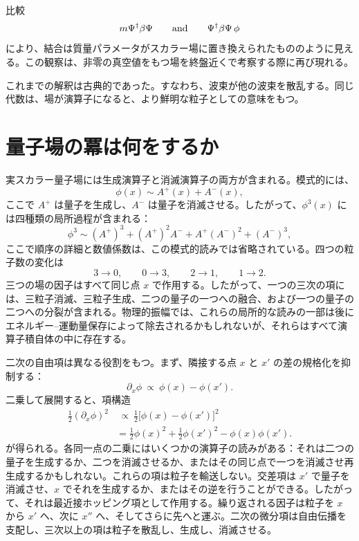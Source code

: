 比較
\begin{equation}
m\Psi^\dagger\beta\Psi
\qquad\hbox{and}\qquad
\Psi^\dagger\beta\Psi\,\phi
\end{equation}
により、結合は質量パラメータがスカラー場に置き換えられたもののように見える。この観察は、非零の真空値をもつ場を終盤近くで考察する際に再び現れる。

これまでの解釈は古典的であった。すなわち、波束が他の波束を散乱する。同じ代数は、場が演算子になると、より鮮明な粒子としての意味をもつ。

\section{量子場の冪は何をするか}

実スカラー量子場には生成演算子と消滅演算子の両方が含まれる。模式的には、
\begin{equation}
\phi(x)\sim A^+(x)+A^-(x),
\end{equation}
ここで \(A^+\) は量子を生成し、\(A^-\) は量子を消滅させる。したがって、\(\phi^3(x)\) には四種類の局所過程が含まれる：
\begin{equation}
\phi^3
\sim
(A^+)^3+(A^+)^2A^-+A^+(A^-)^2+(A^-)^3,
\end{equation}
ここで順序の詳細と数値係数は、この模式的読みでは省略されている。四つの粒子数の変化は
\begin{equation}
3\longrightarrow0,
\qquad
0\longrightarrow3,
\qquad
2\longrightarrow1,
\qquad
1\longrightarrow2.
\end{equation}
三つの場の因子はすべて同じ点 \(x\) で作用する。したがって、一つの三次の項には、三粒子消滅、三粒子生成、二つの量子の一つへの融合、および一つの量子の二つへの分裂が含まれる。物理的振幅では、これらの局所的な読みの一部は後にエネルギー--運動量保存によって除去されるかもしれないが、それらはすべて演算子積自体の中に存在する。

二次の自由項は異なる役割をもつ。まず、隣接する点 \(x\) と \(x'\) の差の規格化を抑制する：
\begin{equation}
\partial_x\phi
\ \propto\
\phi(x)-\phi(x').
\end{equation}
二乗して展開すると、項構造
\begin{align}
\frac12(\partial_x\phi)^2
&\ \propto\
\frac12\bigl[\phi(x)-\phi(x')\bigr]^2
\\
&=
\frac12\phi(x)^2
+\frac12\phi(x')^2
-\phi(x)\phi(x').
\end{align}
が得られる。各同一点の二乗にはいくつかの演算子の読みがある：それは二つの量子を生成するか、二つを消滅させるか、またはその同じ点で一つを消滅させ再生成するかもしれない。これらの項は粒子を輸送しない。交差項は \(x'\) で量子を消滅させ、\(x\) でそれを生成するか、またはその逆を行うことができる。したがって、それは最近接ホッピング項として作用する。繰り返される因子は粒子を \(x\) から \(x'\) へ、次に \(x''\) へ、そしてさらに先へと運ぶ。二次の微分項は自由伝播を支配し、三次以上の項は粒子を散乱し、生成し、消滅させる。

